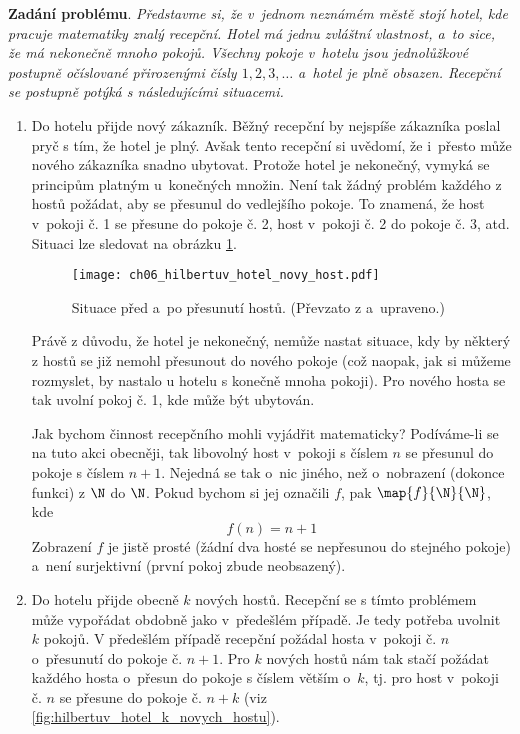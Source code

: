 \noindent\textbf{Zadání problému}. \textit{Představme si, že v~jednom neznámém městě stojí hotel, kde pracuje matematiky znalý recepční. Hotel má jednu zvláštní vlastnost, a~to sice, že má nekonečně mnoho pokojů. Všechny pokoje v~hotelu jsou jednolůžkové postupně očíslované přirozenými čísly $1,2,3,\dots$ a~hotel je plně obsazen. Recepční se postupně potýká s následujícími situacemi.}
\begin{enumerate}[label=\textit{(\roman*)}]
    \item\label{item:novy_host} Do hotelu přijde nový zákazník. Běžný recepční by nejspíše zákazníka poslal pryč s tím, že hotel je plný. Avšak tento recepční si uvědomí, že i~přesto může nového zákazníka snadno ubytovat. Protože hotel je nekonečný, vymyká se principům platným u~konečných množin. Není tak žádný problém každého z hostů požádat, aby se přesunul do vedlejšího pokoje. To znamená, že host v~pokoji č. 1 se přesune do pokoje č. 2, host v~pokoji č. 2 do pokoje č. 3, atd. Situaci lze sledovat na obrázku \ref{fig:hilbertuv_hotel_novy_host}.
    \begin{figure}[h]
        \centering
        \texttt{[image: ch06\_hilbertuv\_hotel\_novy\_host.pdf]}
        \caption{Situace před a~po přesunutí hostů. (Převzato z \cite{Rmoutil2022} a~upraveno.)}
        \label{fig:hilbertuv_hotel_novy_host}
    \end{figure}
    Právě z důvodu, že hotel je nekonečný, nemůže nastat situace, kdy by některý z hostů se již nemohl přesunout do nového pokoje (což naopak, jak si můžeme rozmyslet, by nastalo u hotelu s konečně mnoha pokoji). Pro nového hosta se tak uvolní pokoj č. 1, kde může být ubytován.\par
    Jak bychom činnost recepčního mohli vyjádřit matematicky? Podíváme-li se na tuto akci obecněji, tak libovolný host v~pokoji s číslem $n$ se přesunul do pokoje s číslem $n+1$. Nejedná se tak o~nic jiného, než o~nobrazení (dokonce funkci) z $\N$ do $\N$. Pokud bychom si jej označili $f$, pak $\map{f}{\N}{\N}$, kde
    \begin{equation*}
        f(n)=n+1
    \end{equation*}
    Zobrazení $f$ je jistě prosté (žádní dva hosté se nepřesunou do stejného pokoje) a~není surjektivní (první pokoj zbude neobsazený).
    \item\label{item:k_novych_hostu} Do hotelu přijde obecně $k$ nových hostů. Recepční se s tímto problémem může vypořádat obdobně jako v~předešlém případě. Je tedy potřeba uvolnit $k$ pokojů. V předešlém případě recepční požádal hosta v~pokoji č. $n$ o~přesunutí do pokoje č. $n+1$. Pro $k$ nových hostů nám tak stačí požádat každého hosta o~přesun do pokoje s číslem větším o~$k$, tj. pro host v~pokoji č. $n$ se přesune do pokoje č. $n+k$ (viz \ref{fig:hilbertuv_hotel_k_novych_hostu}).

\end{enumerate}
